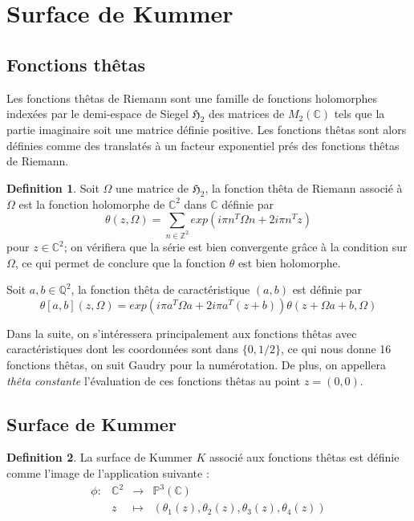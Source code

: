 \documentclass[a4paper]{article}
\theoremstyle{definition}
\newtheorem{definition}{Definition}[section]
\theoremstyle{remark}
\numberwithin{equation}{section}
\begin{document}
\section{Surface de Kummer}

\subsection{Fonctions thêtas}
Les fonctions thêtas de Riemann sont une famille de fonctions holomorphes indexées par le demi-espace de Siegel $\mathfrak{H}_2$ des matrices de $M_2(\mathbb{C})$ tels que la partie imaginaire soit une matrice définie positive. Les fonctions thêtas sont alors définies comme des translatés à un facteur exponentiel prés des fonctions thêtas de Riemann.

\begin{definition}
Soit $\Omega$ une matrice de $\mathfrak{H}_2$, la fonction thêta de Riemann associé à $\Omega$ est la fonction holomorphe de $\mathbb{C}^2$ dans $\mathbb{C}$ définie par
$$\theta(z,\Omega) = \sum_{n \in \mathbb{Z}^2}{exp(i\pi n^T \Omega n + 2i\pi n^T z)}$$
pour $z \in \mathbb{C}^2$; on vérifiera que la série est bien convergente grâce à la condition sur $\Omega$, ce qui permet de conclure que la fonction $\theta$ est bien holomorphe.

Soit $a,b \in \mathbb{Q}^2$, la fonction thêta de caractéristique $(a,b)$ est définie par
$$\theta[a,b](z,\Omega) = exp(i\pi a^T\Omega a + 2i\pi a^T(z+b))\theta(z + \Omega a + b, \Omega)$$
\end{definition}

Dans la suite, on s'intéressera principalement aux fonctions thêtas avec caractéristiques dont les coordonnées sont dans $\{0,1/2\}$, ce qui nous donne 16 fonctions thêtas, on suit Gaudry \cite{gaudry} pour la numérotation. De plus, on appellera \emph{thêta constante} l'évaluation de ces fonctions thêtas au point $z=(0,0)$.

\subsection{Surface de Kummer}

\begin{definition}
La surface de Kummer $K$ associé aux fonctions thêtas est définie comme l'image de l'application suivante :
\begin{equation*}
\begin{array}{lrcl}
\phi :&\mathbb{C}^2 & \longrightarrow & \mathbb{P}^3(\mathbb{C}) \\
& z & \longmapsto & (\theta_1(z),\theta_2(z),\theta_3(z),\theta_4(z))
\end{array}
\end{equation*}
\end{definition}
\end{document}
